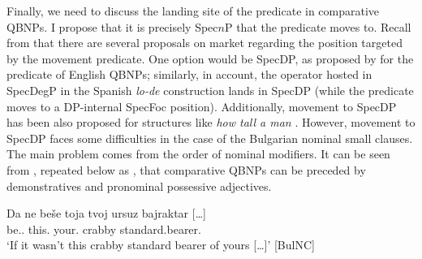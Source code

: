 \documentclass[output=paper]{langscibook}
\begin{document}
Finally, we need to discuss the landing site of the predicate in comparative QBNPs. I propose that it is precisely Spec$n$P that the predicate moves to. Recall from  that there are several proposals on market regarding the position targeted by the movement predicate. One option would be SpecDP, as proposed by \citet{Kayne1994} for the predicate of English QBNPs; similarly, in  account, the operator hosted in SpecDegP in the Spanish \emph{lo-de} construction lands in SpecDP (while the predicate moves to a DP-internal SpecFoc position). Additionally, movement to SpecDP has been also proposed for structures like \emph{how tall a man} \citep[see][]{Hendrick1990}. However, movement to SpecDP faces some difficulties in the case of the Bulgarian nominal small clauses. The main problem comes from the order of nominal modifiers. It can be seen from , repeated below as , that comparative QBNPs can be preceded by demonstratives and pronominal possessive adjectives. 

\ea \label{ge-ex-dem-pron-2}
\gll Da ne be\v{s}e toja tvoj ursuz {bajraktar [\ldots{}]}\\
\Comp{} \Neg{} be.\Pst{}.\Tsg{} this.\M{} your.\M{} crabby standard.bearer.\M{}\\
\glt `If it wasn't this crabby standard bearer of yours  [\ldots{}]' \hfill [BulNC]
\z 
\end{document}
